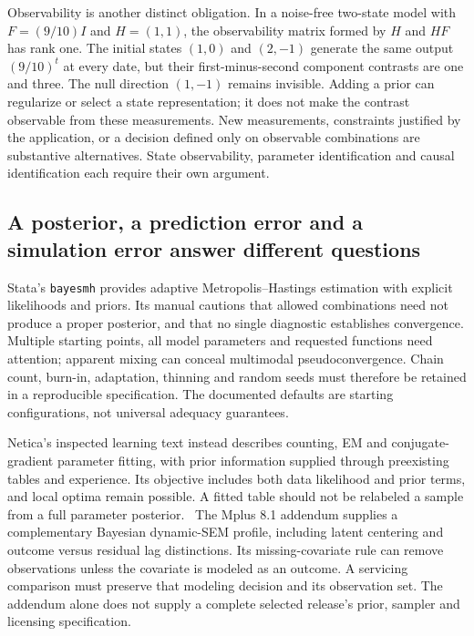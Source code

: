 Observability is another distinct obligation. In a noise-free two-state model
with $F=(9/10)I$ and $H=(1,1)$, the observability matrix formed by $H$ and $HF$
has rank one. The initial states $(1,0)$ and $(2,-1)$ generate the same output
$(9/10)^t$ at every date, but their first-minus-second component contrasts are
one and three. The null direction $(1,-1)$ remains invisible. Adding a prior
can regularize or select a state representation; it does not make the contrast
observable from these measurements. New measurements, constraints justified by
the application, or a decision defined only on observable combinations are
substantive alternatives. State observability, parameter identification and
causal identification each require their own argument.

\subsection{A posterior, a prediction error and a simulation error answer different questions}
\label{exec22:state-uncertainty}

Stata's \texttt{bayesmh} provides adaptive Metropolis--Hastings estimation with
explicit likelihoods and priors. Its manual cautions that allowed combinations
need not produce a proper posterior, and that no single diagnostic establishes
convergence. Multiple starting points, all model parameters and requested
functions need attention; apparent mixing can conceal multimodal
pseudoconvergence. Chain count, burn-in, adaptation, thinning and random seeds
must therefore be retained in a reproducible specification. The documented
defaults are starting configurations, not universal adequacy guarantees.
\citep{exec22_state_stata_bayesmh}

Netica's inspected learning text instead describes counting, EM and
conjugate-gradient parameter fitting, with prior information supplied through
preexisting tables and experience. Its objective includes both data likelihood
and prior terms, and local optima remain possible. A fitted table should not be
relabeled a sample from a full parameter posterior.~\citep{exec13_latent_netica_algorithms}
The Mplus 8.1 addendum supplies a complementary Bayesian dynamic-SEM profile,
including latent centering and outcome versus residual lag distinctions. Its
missing-covariate rule can remove observations unless the covariate is modeled
as an outcome. A servicing comparison must preserve that modeling decision and
its observation set. The addendum alone does not supply a complete selected
release's prior, sampler and licensing specification.~\citep{exec13_ct_mplus81}

